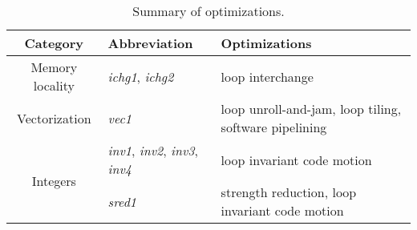 \begin{center}
\begin{table*}[t]
{\small
\hfill{}
\begin{tabular}{|c|l|l|}
  \hline
  \textbf{Category} & \textbf{Abbreviation} & \textbf{Optimizations} \\ 
  \hline
  Memory locality & \textit{ichg1}, \textit{ichg2} & loop interchange \\ 
  \hline
  Vectorization  & \textit{vec1} & loop unroll-and-jam, loop tiling, software pipelining \\ 
  \hline
  \multirow{2}{*}{Integers} & \textit{inv1}, \textit{inv2}, \textit{inv3}, \textit{inv4} & loop invariant code motion \\
  \cline{2-3}
  & \textit{sred1} & strength reduction, loop invariant code motion \\
  \hline
\end{tabular}}
\hfill{}
\caption{Summary of optimizations.}
\label{table:optimizations}
\end{table*}
\end{center}
